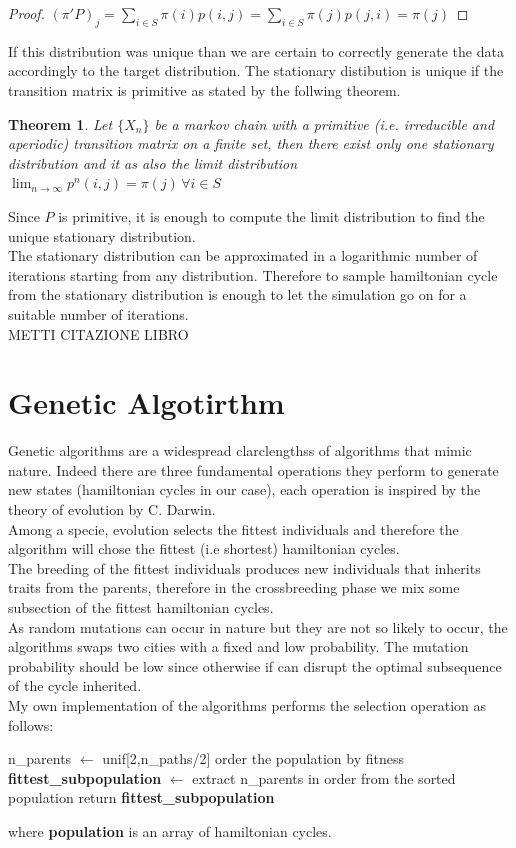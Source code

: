 \documentclass{article}
\newtheorem{theorem}{Theorem}
\begin{document}
\begin{proof}
$ (\pi'P)_j = \sum_{i \in S} \pi(i)p(i,j) = \sum_{i \in S} \pi(j)p(j,i) = \pi(j) $ 
\end{proof}
\noindent If this distribution was unique than we are certain to correctly generate the data accordingly to the target distribution. The stationary distibution is unique if the transition matrix is primitive as stated by the follwing theorem.
\begin{theorem}
Let $\{X_n\}$ be a markov chain with a primitive (i.e. irreducible and aperiodic) transition matrix on a finite set, then  there exist only one stationary distribution and it as also the limit distribution $\lim_{n \to \infty} p^n(i,j) = \pi(j)\,  \forall i \in S$
\end{theorem}
\noindent Since $P$ is primitive, it is enough to compute the limit distribution to find the unique stationary distribution. \\
The stationary distribution can be approximated in a logarithmic number of iterations starting from any distribution. Therefore to sample hamiltonian cycle from the stationary distribution is enough to let the simulation go on for a suitable number of iterations. \\
METTI CITAZIONE LIBRO
\section{Genetic Algotirthm}
Genetic algorithms are a widespread clarclengthss of algorithms that mimic nature. Indeed there are three fundamental operations they perform to generate new states (hamiltonian cycles in our case), each operation is inspired by the theory of evolution by C. Darwin. \\
Among a specie, evolution selects the fittest individuals and therefore the algorithm will chose the fittest (i.e shortest) hamiltonian cycles. \\
The breeding of the fittest individuals produces new individuals that inherits traits from the parents, therefore in the crossbreeding phase we mix some subsection of the fittest hamiltonian cycles. \\
As random mutations can occur in nature but they are not so likely to occur, the algorithms swaps two cities with a fixed and low probability. The mutation probability should be low since otherwise if can disrupt the optimal subsequence of the cycle inherited. \\
My own implementation of the algorithms performs the selection operation as follows:
\begin{algorithm}[H]
    \begin{algorithmic}[1]
        \State n\_parents $\leftarrow$ unif[2,n\_paths/2]
        \State order the population by fitness
        \State \textbf{fittest\_subpopulation} $\leftarrow$ extract n\_parents in order from the sorted population
        \State return \textbf{fittest\_subpopulation}
       \EndFunction
\end{algorithmic}
\end{algorithm}
\noindent where \textbf{population} is an array of hamiltonian cycles.
\end{document}
